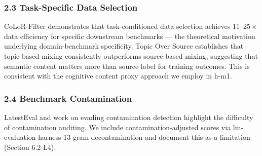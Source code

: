 \subsubsection{2.3 Task-Specific Data Selection}

CoLoR-Filter \citep{Brandfonbrener2024} demonstrates that task-conditioned data selection achieves 11--$25\times$ data efficiency for specific downstream benchmarks --- the theoretical motivation underlying domain-benchmark specificity. Topic Over Source \citep{Peng2025} establishes that topic-based mixing consistently outperforms source-based mixing, suggesting that semantic content matters more than source label for training outcomes. This is consistent with the cognitive content proxy approach we employ in h-m1.

\subsubsection{2.4 Benchmark Contamination}

LatestEval \citep{Li2023} and work on evading contamination detection \citep{Dekoninck2024} highlight the difficulty of contamination auditing. We include contamination-adjusted scores via lm-evaluation-harness 13-gram decontamination and document this as a limitation (Section 6.2 L4).

